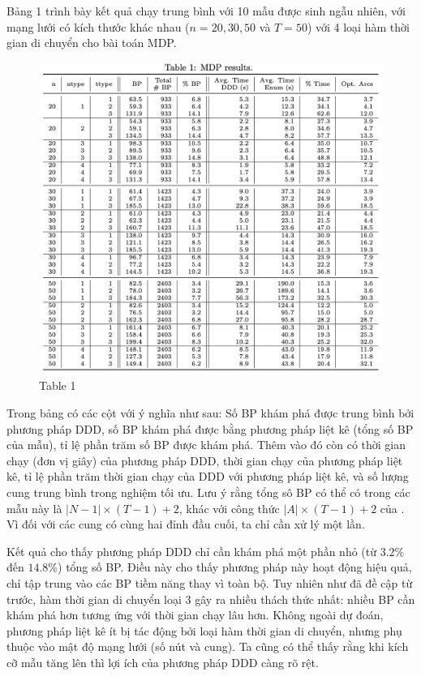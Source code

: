 \documentclass[../main.tex]{subfiles}
\begin{document}
Bảng 1 trình bày kết quả chạy trung bình với 10 mẫu được sinh ngẫu
nhiên, với mạng lưới có kích thước khác nhau (\(n=20,30,50\) và
\(T=50\)) với 4 loại hàm thời gian di chuyển cho bài toán MDP.

\begin{figure}
\centering
\includegraphics{images/Table1.png}
\caption{Table 1}
\end{figure}

Trong bảng có các cột với ý nghĩa như sau: Số BP khám phá được trung
bình bởi phương pháp DDD, số BP khám phá được bằng phương pháp liệt kê
(tổng số BP của mẫu), tỉ lệ phần trăm số BP được khám phá. Thêm vào đó
còn có thời gian chạy (đơn vị giây) của phương pháp DDD, thời gian chạy
của phương pháp liệt kê, tỉ lệ phần trăm thời gian chạy của DDD với
phương pháp liệt kê, và số lượng cung trung bình trong nghiệm tối ưu.
Lưu ý rằng tổng sô BP có thể có trong các mẫu này là
\(|N − 1| \times (T − 1) + 2\), khác với công thức
\(|A| \times (T − 1) + 2\) của \cite{foschini2011complexity}. Vì đối
với các cung có cùng hai đỉnh đầu cuối, ta chỉ cần xử lý một lần.

Kết quả cho thấy phương pháp DDD chỉ cần khám phá một phần nhỏ (từ
\(3.2\%\) đến \(14.8\%\)) tổng số BP. Điều này cho thấy phương pháp này
hoạt động hiệu quả, chỉ tập trung vào các BP tiềm năng thay vì toàn bộ.
Tuy nhiên như đã đề cập từ trước, hàm thời gian di chuyển loại 3 gây ra
nhiều thách thức nhất: nhiều BP cần khám phá hơn tương ứng với thời gian
chạy lâu hơn. Không ngoài dự đoán, phương pháp liệt kê ít bị tác động
bởi loại hàm thời gian di chuyển, nhưng phụ thuộc vào mật độ mạng lưới
(số nút và cung). Ta cũng có thể thấy rằng khi kích cỡ mẫu tăng lên thì
lợi ích của phương pháp DDD càng rõ rệt.
\end{document}
